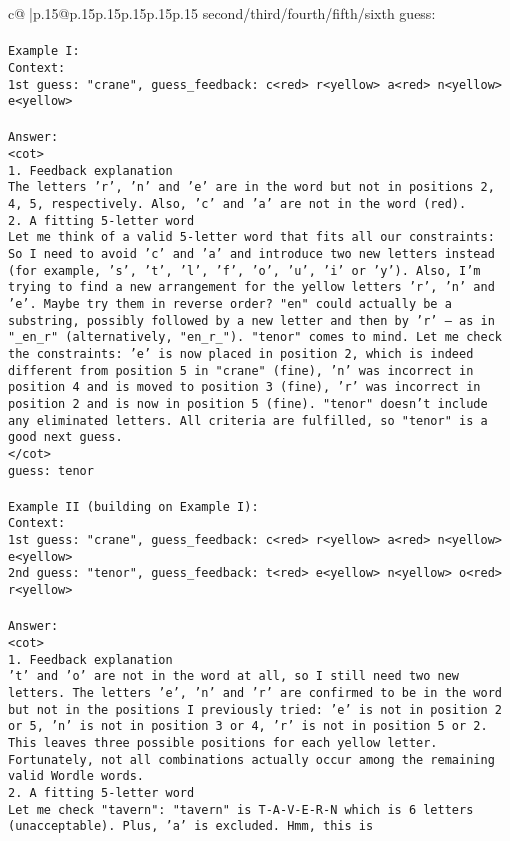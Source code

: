 \documentclass{article}
\begin{document}
{\begin{supertabular}{c@{$\;$}|p{.15\linewidth}@{}p{.15\linewidth}p{.15\linewidth}p{.15\linewidth}p{.15\linewidth}p{.15\linewidth}}
{{{second/third/fourth/fifth/sixth guess:\\ \tt \\ \tt Example I:\\ \tt Context:\\ \tt 1st guess: "crane", guess_feedback: c<red> r<yellow> a<red> n<yellow> e<yellow>\\ \tt \\ \tt Answer:\\ \tt <cot>\\ \tt 1. Feedback explanation\\ \tt The letters 'r', 'n' and 'e' are in the word but not in positions 2, 4, 5, respectively. Also, 'c' and 'a' are not in the word (red).\\ \tt 2. A fitting 5-letter word\\ \tt Let me think of a valid 5-letter word that fits all our constraints: So I need to avoid 'c' and 'a' and introduce two new letters instead (for example, 's', 't', 'l', 'f', 'o', 'u', 'i' or 'y'). Also, I'm trying to find a new arrangement for the yellow letters 'r', 'n' and 'e'. Maybe try them in reverse order? "en" could actually be a substring, possibly followed by a new letter and then by 'r' — as in "_en_r" (alternatively, "en_r_"). "tenor" comes to mind. Let me check the constraints: 'e' is now placed in position 2, which is indeed different from position 5 in "crane" (fine), 'n' was incorrect in position 4 and is moved to position 3 (fine), 'r' was incorrect in position 2 and is now in position 5 (fine). "tenor" doesn't include any eliminated letters. All criteria are fulfilled, so "tenor" is a good next guess.\\ \tt </cot>\\ \tt guess: tenor\\ \tt \\ \tt Example II (building on Example I):\\ \tt Context:\\ \tt 1st guess: "crane", guess_feedback: c<red> r<yellow> a<red> n<yellow> e<yellow>\\ \tt 2nd guess: "tenor", guess_feedback: t<red> e<yellow> n<yellow> o<red> r<yellow>\\ \tt \\ \tt Answer:\\ \tt <cot>\\ \tt 1. Feedback explanation\\ \tt 't' and 'o' are not in the word at all, so I still need two new letters. The letters 'e', 'n' and 'r' are confirmed to be in the word but not in the positions I previously tried: 'e' is not in position 2 or 5, 'n' is not in position 3 or 4, 'r' is not in position 5 or 2. This leaves three possible positions for each yellow letter. Fortunately, not all combinations actually occur among the remaining valid Wordle words.\\ \tt 2. A fitting 5-letter word\\ \tt Let me check "tavern": "tavern" is T-A-V-E-R-N which is 6 letters (unacceptable). Plus, 'a' is excluded. Hmm, this is }}}
\end{supertabular}}
\end{document}
